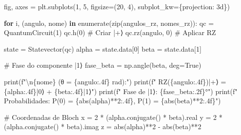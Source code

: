 \documentclass[
  brazilian,
]{report}
\newenvironment{Shaded}{\begin{snugshade}}{\end{snugshade}}
\newcommand{\BuiltInTok}[1]{\textcolor[rgb]{0.00,0.23,0.31}{#1}}
\newcommand{\CharTok}[1]{\textcolor[rgb]{0.13,0.47,0.30}{#1}}
\newcommand{\CommentTok}[1]{\textcolor[rgb]{0.37,0.37,0.37}{#1}}
\newcommand{\ControlFlowTok}[1]{\textcolor[rgb]{0.00,0.23,0.31}{\textbf{#1}}}
\newcommand{\DecValTok}[1]{\textcolor[rgb]{0.68,0.00,0.00}{#1}}
\newcommand{\KeywordTok}[1]{\textcolor[rgb]{0.00,0.23,0.31}{\textbf{#1}}}
\newcommand{\NormalTok}[1]{\textcolor[rgb]{0.00,0.23,0.31}{#1}}
\newcommand{\OperatorTok}[1]{\textcolor[rgb]{0.37,0.37,0.37}{#1}}
\newcommand{\SpecialCharTok}[1]{\textcolor[rgb]{0.37,0.37,0.37}{#1}}
\newcommand{\SpecialStringTok}[1]{\textcolor[rgb]{0.13,0.47,0.30}{#1}}
\newcommand{\StringTok}[1]{\textcolor[rgb]{0.13,0.47,0.30}{#1}}
\newcommand{\VariableTok}[1]{\textcolor[rgb]{0.07,0.07,0.07}{#1}}
\begin{document}
\begin{tcolorbox}
\begin{Shaded}
\begin{Highlighting}[]
\NormalTok{fig, axes }\OperatorTok{=}\NormalTok{ plt.subplots(}\DecValTok{1}\NormalTok{, }\DecValTok{5}\NormalTok{, figsize}\OperatorTok{=}\NormalTok{(}\DecValTok{20}\NormalTok{, }\DecValTok{4}\NormalTok{), subplot\_kw}\OperatorTok{=}\NormalTok{\{}\StringTok{\textquotesingle{}projection\textquotesingle{}}\NormalTok{: }\StringTok{\textquotesingle{}3d\textquotesingle{}}\NormalTok{\})}

\ControlFlowTok{for}\NormalTok{ i, (angulo, nome) }\KeywordTok{in} \BuiltInTok{enumerate}\NormalTok{(}\BuiltInTok{zip}\NormalTok{(angulos\_rz, nomes\_rz)):}
\NormalTok{    qc }\OperatorTok{=}\NormalTok{ QuantumCircuit(}\DecValTok{1}\NormalTok{)}
\NormalTok{    qc.h(}\DecValTok{0}\NormalTok{)  }\CommentTok{\# Criar |+⟩}
\NormalTok{    qc.rz(angulo, }\DecValTok{0}\NormalTok{)  }\CommentTok{\# Aplicar RZ}
    
\NormalTok{    state }\OperatorTok{=}\NormalTok{ Statevector(qc)}
\NormalTok{    alpha }\OperatorTok{=}\NormalTok{ state.data[}\DecValTok{0}\NormalTok{]}
\NormalTok{    beta }\OperatorTok{=}\NormalTok{ state.data[}\DecValTok{1}\NormalTok{]}
    
    \CommentTok{\# Fase do componente |1⟩}
\NormalTok{    fase\_beta }\OperatorTok{=}\NormalTok{ np.angle(beta, deg}\OperatorTok{=}\VariableTok{True}\NormalTok{)}
    
    \BuiltInTok{print}\NormalTok{(}\SpecialStringTok{f"}\CharTok{\textbackslash{}n}\SpecialCharTok{\{}\NormalTok{nome}\SpecialCharTok{\}}\SpecialStringTok{ (θ = }\SpecialCharTok{\{}\NormalTok{angulo}\SpecialCharTok{:.4f\}}\SpecialStringTok{ rad):"}\NormalTok{)}
    \BuiltInTok{print}\NormalTok{(}\SpecialStringTok{f"  RZ(}\SpecialCharTok{\{}\NormalTok{angulo}\SpecialCharTok{:.4f\}}\SpecialStringTok{)|+⟩ = }\SpecialCharTok{\{}\NormalTok{alpha}\SpecialCharTok{:.4f\}}\SpecialStringTok{|0⟩ + }\SpecialCharTok{\{}\NormalTok{beta}\SpecialCharTok{:.4f\}}\SpecialStringTok{|1⟩"}\NormalTok{)}
    \BuiltInTok{print}\NormalTok{(}\SpecialStringTok{f"  Fase de |1⟩: }\SpecialCharTok{\{}\NormalTok{fase\_beta}\SpecialCharTok{:.2f\}}\SpecialStringTok{°"}\NormalTok{)}
    \BuiltInTok{print}\NormalTok{(}\SpecialStringTok{f"  Probabilidades: P(0) = }\SpecialCharTok{\{}\BuiltInTok{abs}\NormalTok{(alpha)}\OperatorTok{**}\DecValTok{2}\SpecialCharTok{:.4f\}}\SpecialStringTok{, P(1) = }\SpecialCharTok{\{}\BuiltInTok{abs}\NormalTok{(beta)}\OperatorTok{**}\DecValTok{2}\SpecialCharTok{:.4f\}}\SpecialStringTok{"}\NormalTok{)}
    
    \CommentTok{\# Coordenadas de Bloch}
\NormalTok{    x }\OperatorTok{=} \DecValTok{2} \OperatorTok{*}\NormalTok{ (alpha.conjugate() }\OperatorTok{*}\NormalTok{ beta).real}
\NormalTok{    y }\OperatorTok{=} \DecValTok{2} \OperatorTok{*}\NormalTok{ (alpha.conjugate() }\OperatorTok{*}\NormalTok{ beta).imag}
\NormalTok{    z }\OperatorTok{=} \BuiltInTok{abs}\NormalTok{(alpha)}\OperatorTok{**}\DecValTok{2} \OperatorTok{{-}} \BuiltInTok{abs}\NormalTok{(beta)}\OperatorTok{**}\DecValTok{2}
    

\end{Highlighting}
\end{Shaded}
\end{tcolorbox}
\end{document}
